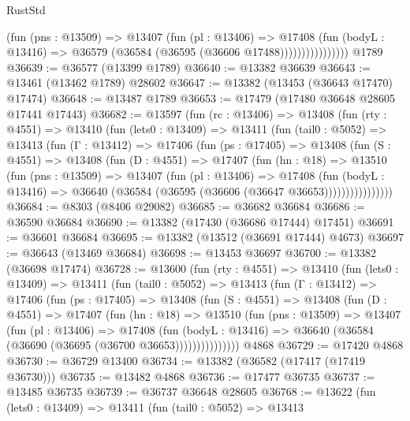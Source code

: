 \begin{lexlean}{RustStd}
\begin{coremodule}
                        (fun (pns : @13509) =>
                        @13407
                          (fun (pl : @13406) =>
                          @17408
                            (fun (bodyL : @13416) =>
                            @36579 (@36584 (@36595 (@36606 @17488))))))))))))))))
    @1789
@36639 := @36577 (@13399 @1789)
@36640 := @13382 @36639
@36643 := @13461 (@13462 @1789) @28602
@36647 := @13382 (@13453 (@36643 @17470) @17474)
@36648 := @13487 @1789
@36653 := @17479 (@17480 @36648 @28605 @17441 @17443)
@36682 := @13597
    (fun (rc : @13406) =>
    @13408
      (fun (rty : @4551) =>
      @13410
        (fun (lets0 : @13409) =>
        @13411
          (fun (tail0 : @5052) =>
          @13413
            (fun (Γ : @13412) =>
            @17406
              (fun (ps : @17405) =>
              @13408
                (fun (S : @4551) =>
                @13408
                  (fun (D : @4551) =>
                  @17407
                    (fun (hn : @18) =>
                    @13510
                      (fun (pns : @13509) =>
                      @13407
                        (fun (pl : @13406) =>
                        @17408
                          (fun (bodyL : @13416) =>
                          @36640 (@36584 (@36595 (@36606 (@36647 @36653))))))))))))))))
@36684 := @8303 (@8406 @29082)
@36685 := @36682 @36684
@36686 := @36590 @36684
@36690 := @13382 (@17430 (@36686 @17444) @17451)
@36691 := @36601 @36684
@36695 := @13382 (@13512 (@36691 @17444) @4673)
@36697 := @36643 (@13469 @36684)
@36698 := @13453 @36697
@36700 := @13382 (@36698 @17474)
@36728 := @13600
    (fun (rty : @4551) =>
    @13410
      (fun (lets0 : @13409) =>
      @13411
        (fun (tail0 : @5052) =>
        @13413
          (fun (Γ : @13412) =>
          @17406
            (fun (ps : @17405) =>
            @13408
              (fun (S : @4551) =>
              @13408
                (fun (D : @4551) =>
                @17407
                  (fun (hn : @18) =>
                  @13510
                    (fun (pns : @13509) =>
                    @13407
                      (fun (pl : @13406) =>
                      @17408
                        (fun (bodyL : @13416) =>
                        @36640 (@36584 (@36690 (@36695 (@36700 @36653)))))))))))))))
    @4868
@36729 := @17420 @4868
@36730 := @36729 @13400
@36734 := @13382 (@36582 (@17417 (@17419 @36730)))
@36735 := @13482 @4868
@36736 := @17477 @36735
@36737 := @13485 @36735
@36739 := @36737 @36648 @28605
@36768 := @13622
    (fun (lets0 : @13409) =>
    @13411
      (fun (tail0 : @5052) =>
      @13413

\end{coremodule}
\end{lexlean}
